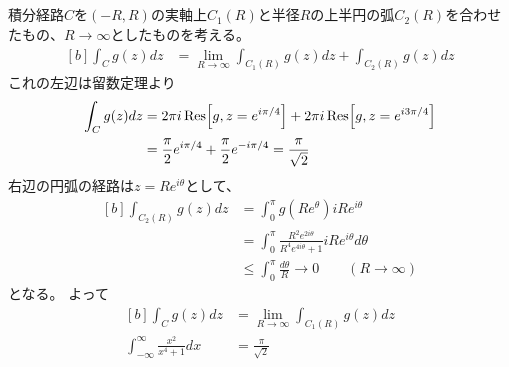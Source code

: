 \documentclass[../ap_2013.tex]{subfiles}
\begin{document}
\subsection{}
積分経路\(C\)を\((-R,R)\)の実軸上\(C_1(R)\)と半径\(R\)の上半円の弧\(C_2(R)\)を合わせたもの、\(R\to \infty\)としたものを考える。
\begin{equation}\begin{aligned}[b]
    \int_C g(z) dz &= \lim_{R\to\infty}\int_{C_1(R)}g(z)dz + \int_{C_2(R)}g(z)dz
\end{aligned}\end{equation}
これの左辺は留数定理より
\begin{equation}\begin{aligned}[b]
    \int_C g(z)dz &= 2\pi i\Res[g,z=e^{i\pi/4}]+2\pi i\Res[g,z=e^{i3\pi/4}]\\
    &=\frac{\pi}{2}e^{i\pi/4}+\frac{\pi}{2}e^{-i\pi/4}
    =\frac{\pi}{\sqrt{2}}
\end{aligned}\end{equation}
右辺の円弧の経路は\(z=Re^{i\theta}\)として、
\begin{equation}\begin{aligned}[b]
    \int_{C_2(R)}g(z)dz
    &= \int_{0}^{\pi}g(Re^{\theta})iRe^{i\theta}\\
    &= \int_{0}^{\pi}\frac{R^2e^{2i\theta}}{R^4e^{4i\theta}+1}iRe^{i\theta}d\theta\\
    &\leq \int_{0}^{\pi} \frac{d\theta}{R} \to 0 \qquad (R\to\infty)
\end{aligned}\end{equation}
となる。
よって
\begin{equation}\begin{aligned}[b]
    \int_C g(z) dz &= \lim_{R\to\infty}\int_{C_1(R)}g(z)dz \\
    \int_{-\infty}^{\infty} \frac{x^2}{x^4+1}dx&= \frac{\pi}{\sqrt{2}}
\end{aligned}\end{equation}
\end{document}
